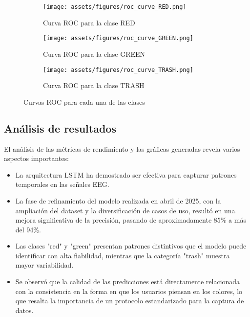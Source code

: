 \begin{figure}[ht]
    \centering
    \begin{subfigure}[b]{0.32\textwidth}
        \centering
        \texttt{[image: assets/figures/roc\_curve\_RED.png]}
        \caption{Curva ROC para la clase RED}
        \label{fig:roc_red}
    \end{subfigure}
    \hfill
    \begin{subfigure}[b]{0.32\textwidth}
        \centering
        \texttt{[image: assets/figures/roc\_curve\_GREEN.png]}
        \caption{Curva ROC para la clase GREEN}
        \label{fig:roc_green}
    \end{subfigure}
    \hfill
    \begin{subfigure}[b]{0.32\textwidth}
        \centering
        \texttt{[image: assets/figures/roc\_curve\_TRASH.png]}
        \caption{Curva ROC para la clase TRASH}
        \label{fig:roc_trash}
    \end{subfigure}
    \caption{Curvas ROC para cada una de las clases}
    \label{fig:roc_curves}
\end{figure}

\subsection{Análisis de resultados}

El análisis de las métricas de rendimiento y las gráficas generadas revela varios aspectos importantes:

\begin{itemize}
    \item La arquitectura LSTM ha demostrado ser efectiva para capturar patrones temporales en las señales EEG.
    
    \item La fase de refinamiento del modelo realizada en abril de 2025, con la ampliación del dataset y la diversificación de casos de uso, resultó en una mejora significativa de la precisión, pasando de aproximadamente 85\% a más del 94\%.
    
    \item Las clases "red" y "green" presentan patrones distintivos que el modelo puede identificar con alta fiabilidad, mientras que la categoría "trash" muestra mayor variabilidad.
    
    \item Se observó que la calidad de las predicciones está directamente relacionada con la consistencia en la forma en que los usuarios piensan en los colores, lo que resalta la importancia de un protocolo estandarizado para la captura de datos.
\end{itemize}

